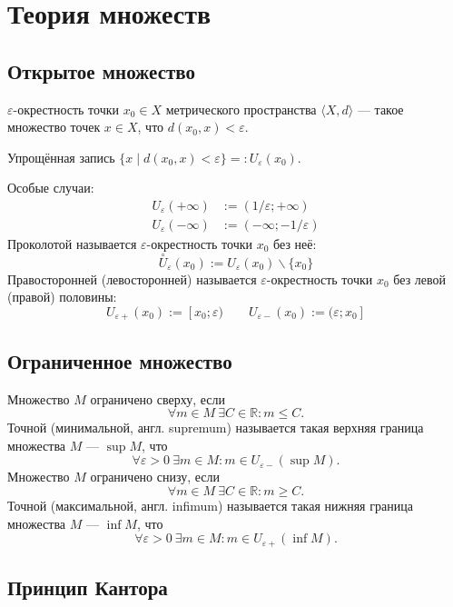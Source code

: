 \section{Теория множеств}

\subsection{Открытое множество}

{\ital $\varepsilon$-окрестность} точки $x_0\in X$ метрического пространства
$\langle X,d\rangle$ --- такое множество точек $x\in X$, что $d(x_0,x)\less\varepsilon$.

Упрощённая запись $\{x\mid d(x_0,x)\less\varepsilon\}=:U_\varepsilon(x_0)$.

Особые случаи:
\begin{align*}
U_\varepsilon(+\infty)&:=(1/\varepsilon;+\infty)\\
U_\varepsilon(-\infty)&:=(-\infty;-1/\varepsilon)
\end{align*}
{\ital Проколотой} называется $\varepsilon$-окрестность точки $x_0$ без неё:\\[-8pt]
$$\overset{\circ}{U}_\varepsilon(x_0):=U_\varepsilon(x_0)\backslash\{x_0\}$$
{\ital Правосторонней (левосторонней)} называется $\varepsilon$-окрестность точки $x_0$
без левой (правой) половины:
$$U_{\varepsilon+}(x_0):=[x_0;\varepsilon)\quad\quad U_{\varepsilon-}(x_0):=(\varepsilon;x_0]$$

\subsection{Ограниченное множество}

Множество $M$ ограничено {\ital сверху}, если
$$\forall m\in M\ \exists C\in\mathbb{R}\colon m\leq C.$$
{\bold Точной} {\ital (минимальной}, англ. {\ital supremum)} называется такая
{\ital верхняя} граница множества $M$ --- $\sup M$, что
$$\forall\varepsilon\greater 0\ \exists m\in M\colon m\in U_{\varepsilon-}(\sup M).$$
Множество $M$ ограничено {\ital снизу}, если
$$\forall m\in M\ \exists C\in\mathbb{R}\colon m\geq C.$$
{\bold Точной} {\ital (максимальной}, англ. {\ital infimum)} называется такая
{\ital нижняя} граница множества $M$ --- $\inf M$, что
$$\forall\varepsilon\greater 0\ \exists m\in M\colon m\in U_{\varepsilon+}(\inf M).$$

\subsection{Принцип Кантора}

